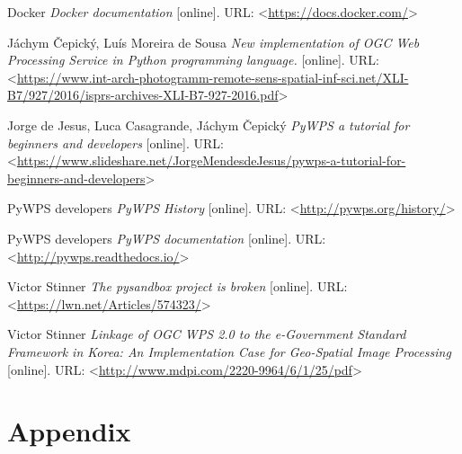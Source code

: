 \documentclass[12pt,a4paper]{article}
\begin{document}
\begin{thebibliography}{99}
Docker \textit{Docker documentation} [online].
URL: \textless\url{https://docs.docker.com/}\textgreater

Jáchym Čepický, Luís Moreira de Sousa \textit{New implementation of OGC Web Processing Service in Python programming language.} [online].
URL: \textless\url{https://www.int-arch-photogramm-remote-sens-spatial-inf-sci.net/XLI-B7/927/2016/isprs-archives-XLI-B7-927-2016.pdf}\textgreater

Jorge de Jesus, Luca Casagrande, Jáchym Čepický \textit{PyWPS a tutorial for beginners and developers} [online].
URL: \textless\url{https://www.slideshare.net/JorgeMendesdeJesus/pywps-a-tutorial-for-beginners-and-developers}\textgreater

PyWPS developers \textit{PyWPS History} [online].
URL: \textless\url{http://pywps.org/history/}\textgreater

PyWPS developers \textit{PyWPS documentation} [online].
URL: \textless\url{http://pywps.readthedocs.io/}\textgreater

Victor Stinner \textit{The pysandbox project is broken} [online].
URL: \textless\url{https://lwn.net/Articles/574323/}\textgreater

Victor Stinner \textit{Linkage of OGC WPS 2.0 to the e-Government Standard Framework in Korea: An Implementation Case for Geo-Spatial Image Processing} [online].
URL: \textless\url{http://www.mdpi.com/2220-9964/6/1/25/pdf}\textgreater
\end{thebibliography}

\newpage
\part{Appendix}

\appendix
\newpage
\end{document}
